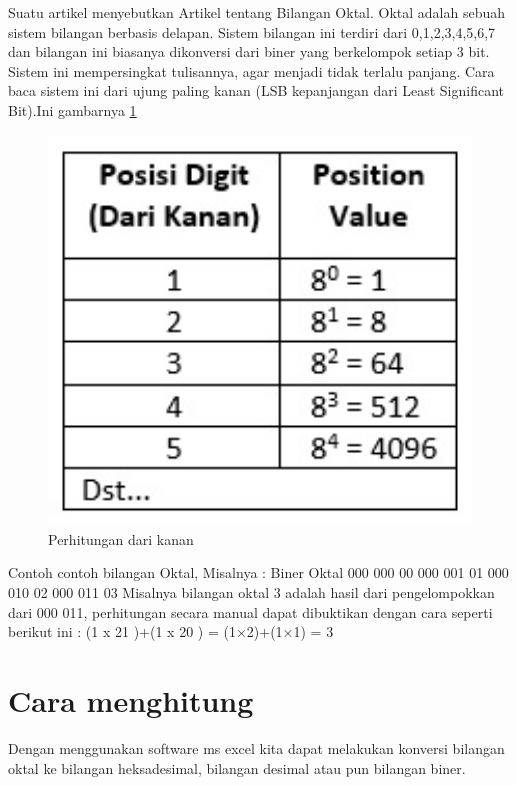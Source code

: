 ﻿%




Suatu artikel menyebutkan \cite{dale2001spacer}
Artikel tentang Bilangan Oktal.
Oktal adalah sebuah sistem bilangan berbasis delapan. Sistem bilangan ini terdiri dari 0,1,2,3,4,5,6,7 dan bilangan ini biasanya dikonversi dari biner yang berkelompok setiap 3 bit. Sistem ini mempersingkat tulisannya, agar menjadi tidak terlalu panjang. Cara baca sistem ini dari ujung paling kanan (LSB kepanjangan dari Least Significant Bit).Ini gambarnya \ref{Posisibilanganoktal}

	
	\begin{figure}[ht]
	\centerline{\includegraphics[width=1\textwidth]{figures/Posisibilanganoktal.JPG}}
	\caption{Perhitungan dari kanan}
	\label{Posisibilanganoktal}
	\end{figure}

Contoh contoh bilangan Oktal,
Misalnya : 
Biner Oktal
000 000 00
000 001 01
000 010 02
000 011 03
Misalnya bilangan oktal 3 adalah hasil dari pengelompokkan dari 000 011, perhitungan secara manual dapat dibuktikan dengan cara seperti berikut ini :
(1 x 21 )+(1 x 20 ) = (1×2)+(1×1) = 3

\section{Cara menghitung}
Dengan menggunakan software ms excel kita dapat melakukan konversi bilangan oktal ke bilangan heksadesimal, bilangan desimal atau pun bilangan biner.
